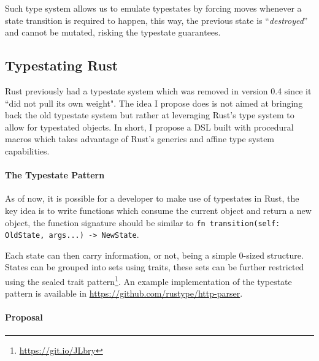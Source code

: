 \documentclass{article}
\begin{document}
Such type system allows us to emulate typestates by forcing moves whenever a state transition is required to happen,
this way, the previous state is “\emph{destroyed}” and cannot be mutated, risking the typestate guarantees.

\subsection*{Typestating Rust}

Rust previously had a typestate system which was removed in version 0.4 since it “did not pull its own weight".
The idea I propose does is not aimed at bringing back the old typestate system but rather at leveraging Rust's type system to allow for typestated objects.
In short, I propose a DSL built with procedural macros which takes advantage of Rust's generics and affine type system capabilities.

\paragraph{The Typestate Pattern}

As of now, it is possible for a developer to make use of typestates in Rust,
the key idea is to write functions which consume the current object and return a new object,
the function signature should be similar to \texttt{fn transition(self: OldState, args...) -> NewState}.

Each state can then carry information, or not, being a simple 0-sized structure.
States can be grouped into sets using traits,
these sets can be further restricted using the sealed trait pattern\footnote{\url{https://git.io/JLbry}}.
An example implementation of the typestate pattern is available in \url{https://github.com/rustype/http-parser}.


\paragraph{Proposal}

\end{document}
